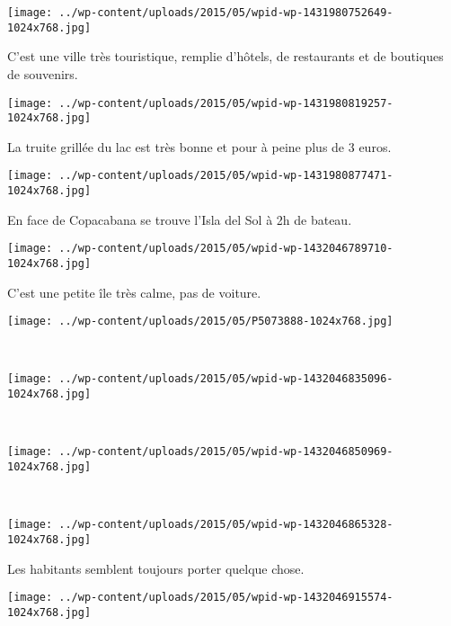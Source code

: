 \begin{center} \texttt{[image: ../wp-content/uploads/2015/05/wpid-wp-1431980752649-1024x768.jpg]} \end{center}

C'est une ville très touristique, remplie d'hôtels, de restaurants et de boutiques de souvenirs. 
\begin{center} \texttt{[image: ../wp-content/uploads/2015/05/wpid-wp-1431980819257-1024x768.jpg]} \end{center}
\vspace{-\topsep}
\pagebreak

La truite grillée du lac est très bonne et pour à peine plus de 3 euros. 
\begin{center} \texttt{[image: ../wp-content/uploads/2015/05/wpid-wp-1431980877471-1024x768.jpg]} \end{center}

En face de Copacabana se trouve l'Isla del Sol à 2h de bateau. 
\begin{center} \texttt{[image: ../wp-content/uploads/2015/05/wpid-wp-1432046789710-1024x768.jpg]} \end{center}
\vspace{-\topsep}
\pagebreak

C'est une petite île très calme, pas de voiture. 
\begin{center} \texttt{[image: ../wp-content/uploads/2015/05/P5073888-1024x768.jpg]} \end{center}
~
\begin{center} \texttt{[image: ../wp-content/uploads/2015/05/wpid-wp-1432046835096-1024x768.jpg]} \end{center}
\vspace{-\topsep}
\pagebreak
~
\begin{center} \texttt{[image: ../wp-content/uploads/2015/05/wpid-wp-1432046850969-1024x768.jpg]} \end{center}
~
\begin{center} \texttt{[image: ../wp-content/uploads/2015/05/wpid-wp-1432046865328-1024x768.jpg]} \end{center}
\vspace{-\topsep}
\pagebreak

Les habitants semblent toujours porter quelque chose. 
\begin{center} \texttt{[image: ../wp-content/uploads/2015/05/wpid-wp-1432046915574-1024x768.jpg]} \end{center}

